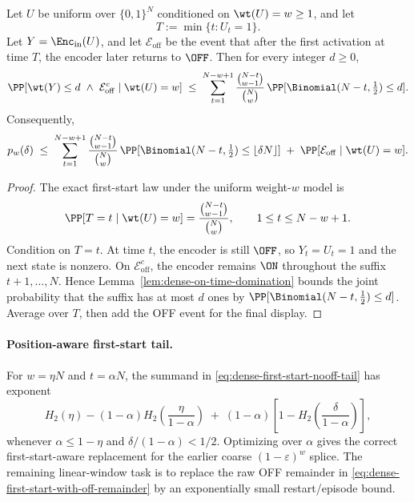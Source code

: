 \begin{lemma}
\label{lem:dense-first-start-nooff-tail}
Let \(U\) be uniform over \(\{0,1\}^N\) conditioned on \(\wt(U)=w\ge 1\), and let
\[
T:=\min\{t:U_t=1\}.
\]
Let \(Y=\Enc_{\mathrm{in}}(U)\), and let \(\mathcal{E}_{\mathrm{off}}\) be the event that after the first activation
at time \(T\), the encoder later returns to \(\OFF\). Then for every integer \(d\ge 0\),
\begin{equation}
\label{eq:dense-first-start-nooff-tail}
\PP[\wt(Y)\le d\ \wedge\ \mathcal{E}_{\mathrm{off}}^c\mid \wt(U)=w]
\;\le\;
\sum_{t=1}^{N-w+1}
\frac{\binom{N-t}{w-1}}{\binom{N}{w}}\,
\PP[\Binomial(N-t,\tfrac12)\le d].
\end{equation}
Consequently,
\begin{equation}
\label{eq:dense-first-start-with-off-remainder}
p_w(\delta)
\;\le\;
\sum_{t=1}^{N-w+1}
\frac{\binom{N-t}{w-1}}{\binom{N}{w}}\,
\PP[\Binomial(N-t,\tfrac12)\le \lfloor\delta N\rfloor]
\;+\;
\PP[\mathcal{E}_{\mathrm{off}}\mid \wt(U)=w].
\end{equation}
\end{lemma}

\begin{proof}
The exact first-start law under the uniform weight-\(w\) model is
\[
\PP[T=t\mid \wt(U)=w]
=
\frac{\binom{N-t}{w-1}}{\binom{N}{w}},
\qquad 1\le t\le N-w+1.
\]
Condition on \(T=t\). At time \(t\), the encoder is still \(\OFF\), so \(Y_t=U_t=1\) and the next state is nonzero.
On \(\mathcal{E}_{\mathrm{off}}^c\), the encoder remains \(\ON\) throughout the suffix \(t+1,\dots,N\). Hence
Lemma~\ref{lem:dense-on-time-domination} bounds the joint probability that the suffix has at most \(d\) ones by
\(\PP[\Binomial(N-t,\tfrac12)\le d]\). Average over \(T\), then add the OFF event for the final display.
\end{proof}

\paragraph{Position-aware first-start tail.}
For \(w=\eta N\) and \(t=\alpha N\), the summand in
\eqref{eq:dense-first-start-nooff-tail} has exponent
\[
H_2(\eta)
-
(1-\alpha)H_2\!\left(\frac{\eta}{1-\alpha}\right)
\;+\;
(1-\alpha)
\left[
1-H_2\!\left(\frac{\delta}{1-\alpha}\right)
\right],
\]
whenever \(\alpha\le 1-\eta\) and \(\delta/(1-\alpha)<1/2\). Optimizing over \(\alpha\) gives the correct
first-start-aware replacement for the earlier coarse \((1-\varepsilon)^w\) splice. The remaining linear-window task is
to replace the raw OFF remainder in \eqref{eq:dense-first-start-with-off-remainder} by an exponentially small
restart/episode bound.

